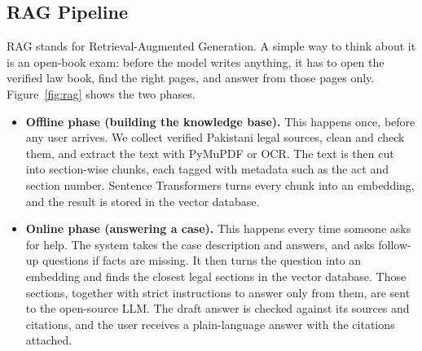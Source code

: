 \documentclass[12pt,a4paper]{report}
\begin{document}
\subsection*{RAG Pipeline}
RAG stands for Retrieval-Augmented Generation. A simple way to think about it is an open-book exam: before the model writes anything, it has to open the verified law book, find the right pages, and answer from those pages only. Figure~\ref{fig:rag} shows the two phases.
\begin{itemize}
  \item \textbf{Offline phase (building the knowledge base).} This happens once, before any user arrives. We collect verified Pakistani legal sources, clean and check them, and extract the text with PyMuPDF or OCR. The text is then cut into section-wise chunks, each tagged with metadata such as the act and section number. Sentence Transformers turns every chunk into an embedding, and the result is stored in the vector database.
  \item \textbf{Online phase (answering a case).} This happens every time someone asks for help. The system takes the case description and answers, and asks follow-up questions if facts are missing. It then turns the question into an embedding and finds the closest legal sections in the vector database. Those sections, together with strict instructions to answer only from them, are sent to the open-source LLM. The draft answer is checked against its sources and citations, and the user receives a plain-language answer with the citations attached.
\end{itemize}
\end{document}
